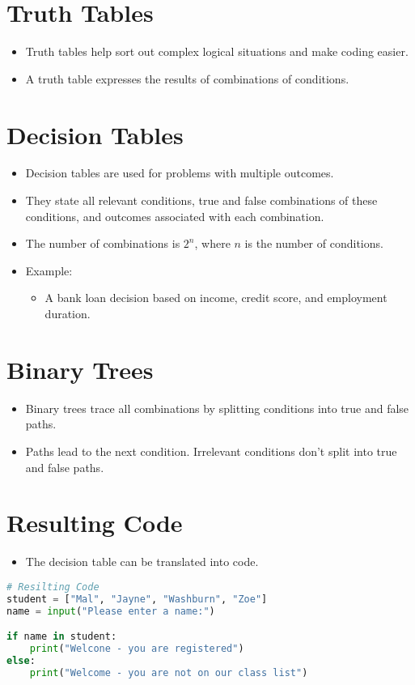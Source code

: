 \documentclass{article}
\begin{document}
\section{Truth Tables}
\begin{itemize}
    \item Truth tables help sort out complex logical situations and make coding easier.
    \item A truth table expresses the results of combinations of conditions.
\end{itemize}

\section{Decision Tables}
\begin{itemize}
    \item Decision tables are used for problems with multiple outcomes.
    \item They state all relevant conditions, true and false combinations of these conditions, and outcomes associated with each combination.
    \item The number of combinations is \(2^n\), where \(n\) is the number of conditions.
\end{itemize}

\begin{itemize}
    \item Example:
    \begin{itemize}
        \item A bank loan decision based on income, credit score, and employment duration.
    \end{itemize}
\end{itemize}

\section{Binary Trees}
\begin{itemize}
    \item Binary trees trace all combinations by splitting conditions into true and false paths.
    \item Paths lead to the next condition. Irrelevant conditions don’t split into true and false paths.
\end{itemize}

\section{Resulting Code}
\begin{itemize}
    \item The decision table can be translated into code.
\end{itemize}
\begin{lstlisting}[language=python]
# Resilting Code
student = ["Mal", "Jayne", "Washburn", "Zoe"]
name = input("Please enter a name:")

if name in student:
    print("Welcone - you are registered")
else:
    print("Welcome - you are not on our class list")        
\end{lstlisting}
\end{document}
